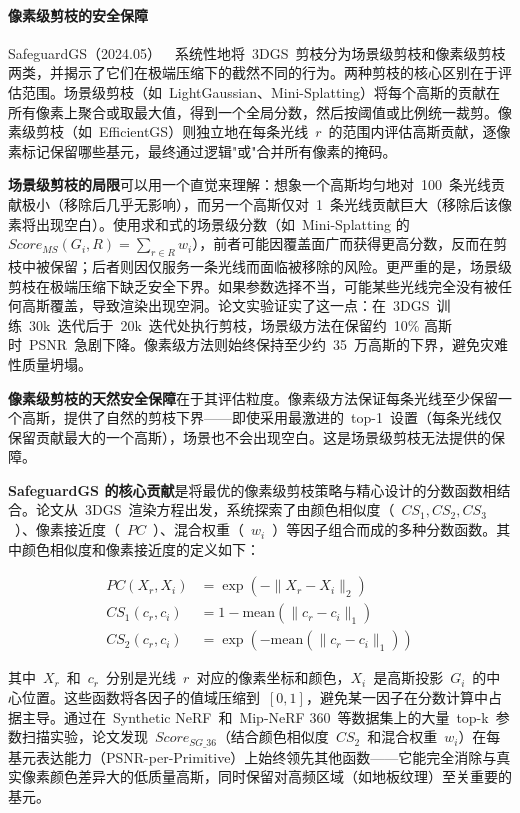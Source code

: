 \paragraph{像素级剪枝的安全保障}

SafeguardGS（2024.05）~\cite{2405_17793}~系统性地将~3DGS~剪枝分为场景级剪枝和像素级剪枝两类，并揭示了它们在极端压缩下的截然不同的行为。两种剪枝的核心区别在于评估范围。场景级剪枝（如~LightGaussian、Mini-Splatting）将每个高斯的贡献在所有像素上聚合或取最大值，得到一个全局分数，然后按阈值或比例统一裁剪。像素级剪枝（如~EfficientGS）则独立地在每条光线~$r$~的范围内评估高斯贡献，逐像素标记保留哪些基元，最终通过逻辑"或"合并所有像素的掩码。

\textbf{场景级剪枝的局限}可以用一个直觉来理解：想象一个高斯均匀地对~100~条光线贡献极小（移除后几乎无影响），而另一个高斯仅对~1~条光线贡献巨大（移除后该像素将出现空白）。使用求和式的场景级分数（如~Mini-Splatting 的~$Score_{MS}(G_i, R) = \sum_{r \in R} w_i$），前者可能因覆盖面广而获得更高分数，反而在剪枝中被保留；后者则因仅服务一条光线而面临被移除的风险。更严重的是，场景级剪枝在极端压缩下缺乏安全下界。如果参数选择不当，可能某些光线完全没有被任何高斯覆盖，导致渲染出现空洞。论文实验证实了这一点：在~3DGS~训练~30k~迭代后于~20k~迭代处执行剪枝，场景级方法在保留约~10\% 高斯时~PSNR~急剧下降。像素级方法则始终保持至少约~35~万高斯的下界，避免灾难性质量坍塌。

\textbf{像素级剪枝的天然安全保障}在于其评估粒度。像素级方法保证每条光线至少保留一个高斯，提供了自然的剪枝下界——即使采用最激进的~top-1~设置（每条光线仅保留贡献最大的一个高斯），场景也不会出现空白。这是场景级剪枝无法提供的保障。

\textbf{SafeguardGS 的核心贡献}是将最优的像素级剪枝策略与精心设计的分数函数相结合。论文从~3DGS~渲染方程出发，系统探索了由颜色相似度（~$CS_1, CS_2, CS_3$~）、像素接近度（~$PC$~）、混合权重（~$w_i$~）等因子组合而成的多种分数函数。其中颜色相似度和像素接近度的定义如下：

\begin{align}
PC(X_r, X_i) &= \exp(-\|X_r - X_i\|_2) \\
CS_1(c_r, c_i) &= 1 - \text{mean}(\|c_r - c_i\|_1) \\
CS_2(c_r, c_i) &= \exp(-\text{mean}(\|c_r - c_i\|_1))
\end{align}

其中~$X_r$~和~$c_r$~分别是光线~$r$~对应的像素坐标和颜色，$X_i$~是高斯投影~$G_i$~的中心位置。这些函数将各因子的值域压缩到~$[0,1]$，避免某一因子在分数计算中占据主导。通过在~Synthetic NeRF~和~Mip-NeRF 360~等数据集上的大量~top-k~参数扫描实验，论文发现~$Score_{SG\_36}$（结合颜色相似度~$CS_2$~和混合权重~$w_i$）在每基元表达能力（PSNR-per-Primitive）上始终领先其他函数——它能完全消除与真实像素颜色差异大的低质量高斯，同时保留对高频区域（如地板纹理）至关重要的基元。

